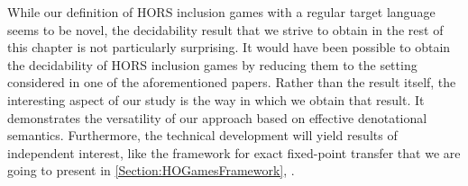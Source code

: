 \documentclass[../../diss.tex]{subfiles}
\begin{document}
While our definition of HORS inclusion games with a regular target language seems to be novel, the decidability result that we strive to obtain in the rest of this chapter is not particularly surprising.
It would have been possible to obtain the decidability of HORS inclusion games by reducing them to the setting considered in one of the aforementioned papers.
Rather than the result itself, the interesting aspect of our study is the way in which we obtain that result.
It demonstrates the versatility of our approach based on effective denotational semantics.
Furthermore, the technical development will yield results of independent interest, like the framework for exact fixed-point transfer that we are going to present in \cref{Section:HOGamesFramework}, .
\end{document}
